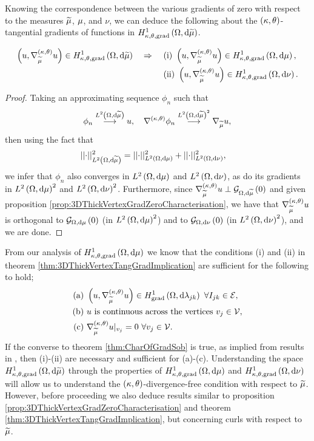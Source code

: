 Knowing the correspondence between the various gradients of zero with respect to the measures $\widetilde{\mu}$, $\mu$, and $\nu$, we can deduce the following about the $\left( \kappa, \theta \right)$-tangential gradients of functions in $H^1_{\kappa,\theta,\mathrm{grad}}\left( \Omega, \mathrm{d}\widetilde{\mu} \right)$.
\begin{theorem} \label{thm:3DThickVertexTangGradImplication}
	\begin{align*}
		\left( u, \nabla^{\left( \kappa, \theta \right)}_{\widetilde{\mu}}u \right)\in H^1_{\kappa,\theta,\mathrm{grad}}\left( \Omega, \mathrm{d}\widetilde{\mu} \right) \quad\Rightarrow\quad
		& \ \mathrm{(i)} \ \left( u, \nabla^{\left( \kappa, \theta \right)}_{\widetilde{\mu}}u \right)\in H^1_{\kappa,\theta,\mathrm{grad}}\left( \Omega, \mathrm{d}\mu \right), \\
		& \ \mathrm{(ii)} \ \left( u, \nabla^{\left( \kappa, \theta \right)}_{\widetilde{\mu}}u \right)\in H^1_{\kappa,\theta,\mathrm{grad}}\left( \Omega, \mathrm{d}\nu \right). \\
	\end{align*}
\end{theorem}
\begin{proof}
	Taking an approximating sequence $\phi_n$ such that
	\begin{align*}
		\phi_n \overset{L^{2}\left( \Omega,\mathrm{d}\widetilde{\mu} \right)}{\longrightarrow} u, \quad \nabla^{\left( \kappa, \theta \right)}\phi_n\overset{L^{2}\left( \Omega,\mathrm{d}\widetilde{\mu} \right)^2}{\longrightarrow}\nabla_{\widetilde{\mu}}u,
	\end{align*}
	then using the fact that
	\begin{align*}
		\lvert\lvert \cdot \rvert\rvert_{L^{2}\left( \Omega,\mathrm{d}\widetilde{\mu} \right)}^2 &= \lvert\lvert \cdot \rvert\rvert_{L^{2}\left( \Omega,\mathrm{d}\mu \right)}^2 + \lvert\lvert \cdot \rvert\rvert_{L^{2}\left( \Omega,\mathrm{d}\nu \right)}^2,
	\end{align*}
	we infer that $\phi_n$ also converges in $L^{2}\left( \Omega,\mathrm{d}\mu \right)$ and $L^{2}\left( \Omega,\mathrm{d}\nu \right)$, as do its gradients in $L^{2}\left( \Omega,\mathrm{d}\mu \right)^2$ and $L^{2}\left( \Omega,\mathrm{d}\nu \right)^2$.
	Furthermore, since $\nabla^{\left( \kappa, \theta \right)}_{\widetilde{\mu}}u \perp \mathcal{G}_{ \Omega, \mathrm{d}\widetilde{\mu}}\left( 0 \right)$ and given proposition \ref{prop:3DThickVertexGradZeroCharacterisation}, we have that $\nabla^{\left( \kappa, \theta \right)}_{\widetilde{\mu}}u$ is orthogonal to $\mathcal{G}_{ \Omega, \mathrm{d}\mu}\left( 0 \right)$ (in $L^{2}\left( \Omega,\mathrm{d}\mu \right)^2$) and to $\mathcal{G}_{ \Omega, \mathrm{d}\nu}\left( 0 \right)$ (in $L^{2}\left( \Omega,\mathrm{d}\nu \right)^2$), and we are done. 
\end{proof}
From our analysis of $H^1_{\kappa,\theta,\mathrm{grad}}\left( \Omega, \mathrm{d}\mu \right)$ we know that the conditions (i) and (ii) in theorem \ref{thm:3DThickVertexTangGradImplication} are sufficient for the following to hold;
\begin{align*}
		\text{(a)} \ & \bracs{u, \ktgrad_{\dddmes}u}\in\gradSob{\ddom}{\lambda_{jk}} \ \forall I_{jk}\in\edgeSet, \\
		\text{(b)} \ & u \text{ is continuous across the vertices} \ v_j\in\vertSet, \\
		\text{(c)} \ & \ktgrad_{\dddmes}u\vert_{v_j} = 0 \ \forall v_j\in\vertSet.
\end{align*}
If the converse to theorem \ref{thm:CharOfGradSob} is true, as implied from results in \cite{zhikov2002homogenization}, then (i)-(ii) are necessary and sufficient for (a)-(c).
Understanding the space $H^1_{\kappa,\theta,\mathrm{grad}}\left( \Omega, \mathrm{d}\widetilde{\mu} \right)$ through the properties of $H^1_{\kappa,\theta,\mathrm{grad}}\left( \Omega, \mathrm{d}\mu \right)$ and $H^1_{\kappa,\theta,\mathrm{grad}}\left( \Omega, \mathrm{d}\nu \right)$ will allow us to understand the $\left( \kappa, \theta \right)$-divergence-free condition with respect to $\widetilde{\mu}$.
However, before proceeding we also deduce results similar to proposition \ref{prop:3DThickVertexGradZeroCharacterisation} and theorem \ref{thm:3DThickVertexTangGradImplication}, but concerning curls with respect to $\widetilde{\mu}$.

